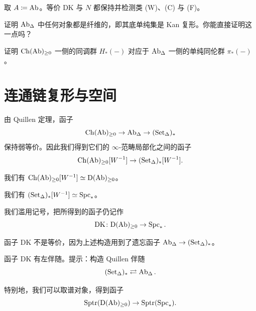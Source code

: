\begin{theorem}[Quillen]\label{L18-2.4}
取 $A\coloneqq\operatorname{Ab}$。等价 $\mathrm{DK}$ 与 $N$ 都保持并检测类 (W)、(C) 与 (F)。
\end{theorem}

\begin{exercise}\label{L18-2.5}
证明 $\operatorname{Ab}_{\Delta}$ 中任何对象都是纤维的，即其底单纯集是 Kan 复形。你能直接证明这一点吗？
\end{exercise}

\begin{exercise}\label{L18-2.6}
证明 $\operatorname{Ch}(\operatorname{Ab})_{\ge 0}$ 一侧的同调群 $H_{*}(-)$ 对应于 $\operatorname{Ab}_{\Delta}$ 一侧的单纯同伦群 $\pi_{*}(-)$。
\end{exercise}

\section{连通链复形与空间}

\nitem\label{L18-3.1} 由 Quillen 定理，函子
\[
\operatorname{Ch}(\operatorname{Ab})_{\ge 0}\to\operatorname{Ab}_{\Delta}\to(\operatorname{Set}_{\Delta})_{\ast}
\]
保持弱等价。因此我们得到它们的 $\infty$-范畴局部化之间的函子
\[
\operatorname{Ch}(\operatorname{Ab})_{\ge 0}[W^{-1}]\to(\operatorname{Set}_{\Delta})_{\ast}[W^{-1}].
\]

\begin{exercise}\label{L18-3.2}
我们有 $\operatorname{Ch}(\operatorname{Ab})_{\ge 0}[W^{-1}]\simeq\mathrm{D}(\operatorname{Ab})_{\ge 0}$。
\end{exercise}

\begin{exercise}\label{L18-3.3}
我们有 $(\operatorname{Set}_{\Delta})_{\ast}[W^{-1}]\simeq\operatorname{Spc}_{\ast}$。
\end{exercise}

\nitem\label{L18-3.4} 我们滥用记号，把所得到的函子仍记作
\[
\mathrm{DK}\colon\mathrm{D}(\operatorname{Ab})_{\ge 0}\to\operatorname{Spc}_{\ast}.
\]

\begin{warning}\label{L18-3.5}
函子 $\mathrm{DK}$ 不是等价，因为上述构造用到了遗忘函子 $\operatorname{Ab}_{\Delta}\to(\operatorname{Set}_{\Delta})_{\ast}$。
\end{warning}

\begin{exercise}\label{L18-3.6}
函子 $\mathrm{DK}$ 有左伴随。提示：构造 Quillen 伴随
\[
(\operatorname{Set}_{\Delta})_{\ast}\rightleftarrows\operatorname{Ab}_{\Delta}.
\]
\end{exercise}

\nitem\label{L18-3.7} 特别地，我们可以取谱对象，得到函子
\[
\operatorname{Sptr}(\mathrm{D}(\operatorname{Ab})_{\ge 0})\to\operatorname{Sptr}(\operatorname{Spc}_{\ast}).
\]


